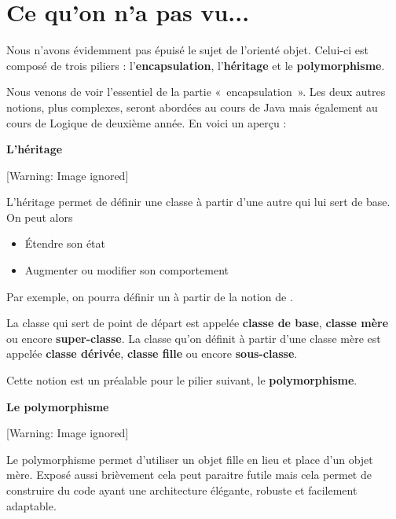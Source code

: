 \section{Ce qu'on n'a pas vu...}
{
Nous n'avons évidemment pas épuisé le sujet de
l'orienté objet. Celui-ci est composé de trois piliers
: l'\textbf{encapsulation},
l'\textbf{héritage} et le \textbf{polymorphisme}.}

{
Nous venons de voir l'essentiel de la partie
«~encapsulation~». Les deux autres notions, plus complexes, seront
abordées au cours de Java mais également au cours de Logique de
deuxième année. En voici un aperçu :}

{\sffamily\bfseries\upshape
L'héritage}

\begin{center}
 [Warning: Image ignored] %

\end{center}
{
L’héritage permet de définir une classe à partir d’une autre qui lui
sert de base. On peut alors }

\liststyleListv
\begin{itemize}
\item {
Étendre son état}
\item {
Augmenter ou modifier son comportement}
\end{itemize}
{
Par exemple, on pourra définir un  à partir
de la notion de .}

{
La classe qui sert de point de départ est appelée \textbf{classe de
base}, \textbf{classe mère} ou encore \textbf{super-classe}. La classe
qu’on définit à partir d’une classe mère est appelée \textbf{classe
dérivée}, \textbf{classe fille} ou encore \textbf{sous-classe}.}

{
Cette notion est un préalable pour le pilier suivant, le
\textbf{polymorphisme}.}

{\sffamily\bfseries\upshape
Le polymorphisme}

\begin{center}
 [Warning: Image ignored] %

\end{center}
{
Le polymorphisme permet d’utiliser un objet fille en lieu et place d’un
objet mère. Exposé aussi brièvement cela peut paraitre futile mais cela
permet de construire du code ayant une architecture élégante, robuste
et facilement adaptable.}

